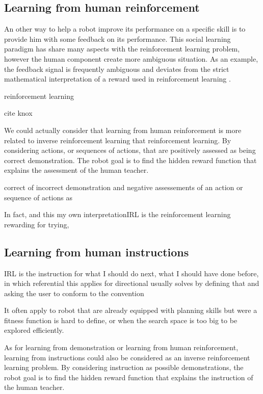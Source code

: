 \subsection{Learning from human reinforcement}

An other way to help a robot improve its performance on a specific skill is to provide him with some feedback on its performance. This social learning paradigm has share many aspects with the reinforcement learning problem, however the human component create more ambiguous situation. As an example, the feedback signal is frequently ambiguous and deviates from the strict mathematical interpretation of a reward used in reinforcement learning \cite{thomaz2008teachable,Cakmak2010optimality}.


reinforcement learning \cite{thomaz2008teachable}

cite knox

We could actually consider that learning from human reinforcement is more related to inverse reinforcement learning that reinforcement learning. By considering actions, or sequences of actions, that are positively assessed as being correct demonstration. The robot goal is to find the hidden reward function that explains the assessment of the human teacher.


correct of incorrect demonstration
and negative assessements of an action or sequence of actions as


In fact, and this my own interpretationIRL
is the reinforcement learning rewarding for trying,

\subsection{Learning from human instructions}

IRL
is the instruction for what I should do next, what I should have done before, in which referential this applies for directional
usually solves by defining that and asking the user to conform to the convention

It often apply to robot that are already equipped with planning skills but were a fitness function is hard to define, or when the search space is too big to be explored efficiently.

As for learning from demonstration or learning from human reinforcement, learning from instructions could also be considered as an inverse reinforcement learning problem. By considering instruction as possible demonstrations, the robot goal is to find the hidden reward function that explains the instruction of the human teacher.




